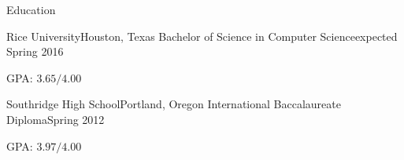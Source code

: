 \documentclass{resume}
\begin{document}
\begin{rSection}{Education}

\begin{rSubSection}{Rice University}{Houston, Texas}
{Bachelor of Science in Computer Science}{expected Spring 2016}
\item GPA: $3.65/4.00$
\end{rSubSection}

\begin{rSubSection}{Southridge High School}{Portland, Oregon}
{International Baccalaureate Diploma}{Spring 2012}
\item GPA: $3.97/4.00$
\end{rSubSection}

\end{rSection}
\end{document}
